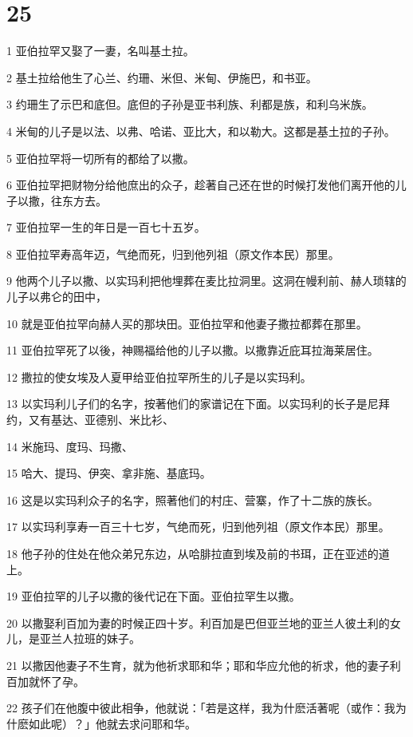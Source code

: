 \chapter{25}

\par 1 亚伯拉罕又娶了一妻，名叫基土拉。
\par 2 基土拉给他生了心兰、约珊、米但、米甸、伊施巴，和书亚。
\par 3 约珊生了示巴和底但。底但的子孙是亚书利族、利都是族，和利乌米族。
\par 4 米甸的儿子是以法、以弗、哈诺、亚比大，和以勒大。这都是基土拉的子孙。
\par 5 亚伯拉罕将一切所有的都给了以撒。
\par 6 亚伯拉罕把财物分给他庶出的众子，趁著自己还在世的时候打发他们离开他的儿子以撒，往东方去。
\par 7 亚伯拉罕一生的年日是一百七十五岁。
\par 8 亚伯拉罕寿高年迈，气绝而死，归到他列祖（原文作本民）那里。
\par 9 他两个儿子以撒、以实玛利把他埋葬在麦比拉洞里。这洞在幔利前、赫人琐辖的儿子以弗仑的田中，
\par 10 就是亚伯拉罕向赫人买的那块田。亚伯拉罕和他妻子撒拉都葬在那里。
\par 11 亚伯拉罕死了以後，神赐福给他的儿子以撒。以撒靠近庇耳拉海莱居住。
\par 12 撒拉的使女埃及人夏甲给亚伯拉罕所生的儿子是以实玛利。
\par 13 以实玛利儿子们的名字，按著他们的家谱记在下面。以实玛利的长子是尼拜约，又有基达、亚德别、米比衫、
\par 14 米施玛、度玛、玛撒、
\par 15 哈大、提玛、伊突、拿非施、基底玛。
\par 16 这是以实玛利众子的名字，照著他们的村庄、营寨，作了十二族的族长。
\par 17 以实玛利享寿一百三十七岁，气绝而死，归到他列祖（原文作本民）那里。
\par 18 他子孙的住处在他众弟兄东边，从哈腓拉直到埃及前的书珥，正在亚述的道上。
\par 19 亚伯拉罕的儿子以撒的後代记在下面。亚伯拉罕生以撒。
\par 20 以撒娶利百加为妻的时候正四十岁。利百加是巴但亚兰地的亚兰人彼土利的女儿，是亚兰人拉班的妹子。
\par 21 以撒因他妻子不生育，就为他祈求耶和华；耶和华应允他的祈求，他的妻子利百加就怀了孕。
\par 22 孩子们在他腹中彼此相争，他就说：「若是这样，我为什麽活著呢（或作：我为什麽如此呢）？」他就去求问耶和华。
